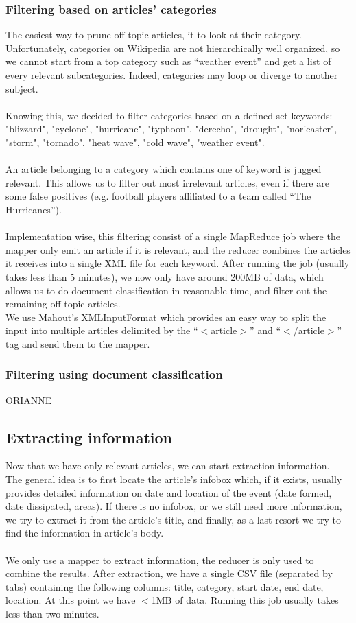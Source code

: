 \subsubsection{Filtering based on articles' categories}
The easiest way to prune off topic articles, it to look at their category. Unfortunately, categories on Wikipedia are not hierarchically well organized, so we cannot start from a top category such as ``weather event'' and get a list of every relevant subcategories. Indeed, categories may loop or diverge to another subject.\\\\
Knowing this, we decided to filter categories based on a defined set keywords: "blizzard", "cyclone", "hurricane", "typhoon", "derecho", "drought", "nor'easter", "storm", "tornado", "heat wave", "cold wave", "weather event". \\\\
An article belonging to a category which contains one of keyword is jugged relevant. This allows us to filter out most irrelevant articles, even if there are some false positives (e.g. football players affiliated to a team called ``The Hurricanes'').\\\\
Implementation wise, this filtering consist of a single MapReduce job where the mapper only emit an article if it is relevant, and the reducer combines the articles it receives into a single XML file for each keyword. 
After running the job (usually takes less than 5 minutes), we now only have around 200MB of data, which allows us to do document classification in reasonable time, and filter out the remaining off topic articles.\\ 
We use Mahout's XMLInputFormat which provides an easy way to split the input into multiple articles delimited by the ``$<$article$>$'' and ``$<$/article$>$'' tag and send them to the mapper.
\subsubsection{Filtering using document classification}
ORIANNE
\subsection{Extracting information}
Now that we have only relevant articles, we can start extraction information. \\
The general idea is to first locate the article's infobox which, if it exists, usually provides detailed information on date and location of the event (date formed, date dissipated, areas). If there is no infobox, or we still need more information, we try to extract it from the article's title, and finally, as a last resort we try to find the information in article's body.\\\\
We only use a mapper to extract information, the reducer is only used to combine the results.
After extraction, we have a single CSV file (separated by tabs) containing the following columns: title, category, start date, end date, location. At this point we have $<$1MB of data. Running this job usually takes less than two minutes.
